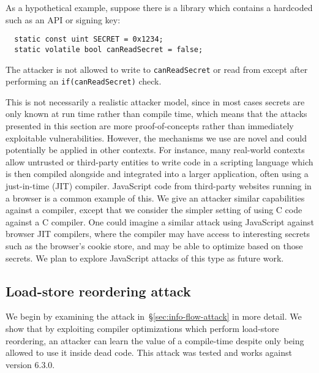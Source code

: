As a hypothetical example, suppose there is a library which contains
a hardcoded {\SEC} such as an API or signing key:
\begin{verbatim}
  static const uint SECRET = 0x1234;
  static volatile bool canReadSecret = false;
\end{verbatim}
The attacker is not allowed to write to \verb|canReadSecret| or read from {\SEC}
except after performing an \verb|if(canReadSecret)| check.

This is not necessarily a realistic attacker model,
since in most cases secrets are only known at run time rather than compile time,
which means that the attacks presented in this section
are more proof-of-concepts rather than immediately exploitable vulnerabilities.
However, the mechanisms we use are novel and could potentially be applied
in other contexts.
For instance, many real-world contexts allow untrusted or
third-party entities to write code in a scripting language which is then
compiled alongside and integrated into a larger application, often
using a just-in-time (JIT) compiler.
JavaScript code from third-party websites running in a browser is a common
example of this.
We give an attacker similar capabilities against a
compiler, except that we consider the simpler setting of using C code against a C
compiler.
One could imagine a similar attack using JavaScript against browser JIT
compilers, where the compiler may have access to interesting secrets such as the
browser's cookie store, and may be able to optimize based on those secrets.
We plan to explore JavaScript attacks of this type as future work.

\subsection{Load-store reordering attack}
\label{subsec:exp-rel-mem}

We begin by examining the attack in~\S\ref{sec:info-flow-attack} in
more detail.
We show that by exploiting compiler optimizations which perform
load-store reordering, an attacker can learn the value of a compile-time
{\SEC} despite only being allowed to use it inside dead code.
This attack was tested and works against {\GCC} version 6.3.0.

